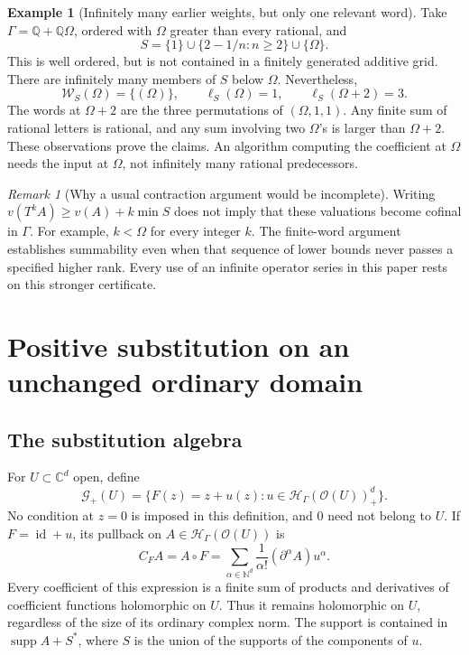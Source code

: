\documentclass[11pt,letterpaper]{article}
\theoremstyle{definition}
\newtheorem{example}[example]{Example}
\theoremstyle{remark}
\newtheorem{remark}[remark]{Remark}
\newcommand{\C}{\mathbb C}
\newcommand{\Q}{\mathbb Q}
\newcommand{\N}{\mathbb N}
\newcommand{\HH}{\mathscr H}
\newcommand{\OO}{\mathcal O}
\newcommand{\GG}{\mathscr G}
\newcommand{\id}{\operatorname{id}}
\newcommand{\supp}{\operatorname{supp}}
\newcommand{\word}{\mathcal W}
\numberwithin{equation}{section}
\begin{document}
\begin{example}[Infinitely many earlier weights, but only one relevant word]
\label{ex:ranktwo}
Take $\Gamma=\Q+\Q\Omega$, ordered with $\Omega$ greater than every rational,
and
\[
 S=\{1\}\cup\{2-1/n:n\ge2\}\cup\{\Omega\}.
\]
This is well ordered, but is not contained in a finitely generated additive
grid. There are infinitely many members of $S$ below $\Omega$. Nevertheless,
\[
 \word_S(\Omega)=\{(\Omega)\},\qquad
 \ell_S(\Omega)=1,\qquad \ell_S(\Omega+2)=3.
\]
The words at $\Omega+2$ are the three permutations of $(\Omega,1,1)$.
Any finite sum of rational letters is rational, and any sum involving two
$\Omega$'s is larger than $\Omega+2$. These observations prove the claims.
An algorithm computing the coefficient at $\Omega$ needs the input at
$\Omega$, not infinitely many rational predecessors.
\end{example}

\begin{remark}[Why a usual contraction argument would be incomplete]
Writing $v(T^kA)\ge v(A)+k\min S$ does not imply that these valuations
become cofinal in $\Gamma$. For example, $k<\Omega$ for every integer $k$.
The finite-word argument establishes summability even when that sequence of
lower bounds never passes a specified higher rank. Every use of an infinite
operator series in this paper rests on this stronger certificate.
\end{remark}

\section{Positive substitution on an unchanged ordinary domain}
\label{sec:substitution}

\subsection{The substitution algebra}
For $U\subset\C^d$ open, define
\[
 \GG_+(U)=\{F(z)=z+u(z):u\in\HH_\Gamma(\OO(U))_+^d\}.
\]
No condition at $z=0$ is imposed in this definition, and $0$ need not belong
to $U$. If $F=\id+u$, its pullback on $A\in\HH_\Gamma(\OO(U))$ is
\begin{equation}\label{eq:pullback}
 C_F A=A\circ F=
 \sum_{\alpha\in\N^d}\frac{1}{\alpha!}
                 (\partial^\alpha A)u^\alpha.
\end{equation}
Every coefficient of this expression is a finite sum of products and
derivatives of coefficient functions holomorphic on $U$. Thus it remains
holomorphic on $U$, regardless of the size of its ordinary complex norm.
The support is contained in $\supp A+S^*$, where $S$ is the union of the
supports of the components of $u$.
\end{document}
